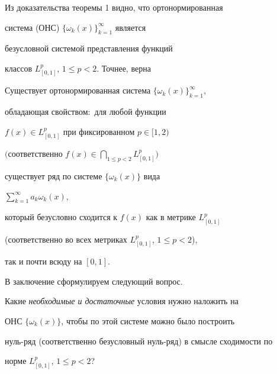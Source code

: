 Из доказательства теоремы 1 видно, что ортонормированная 


система (ОНС) $\{ \omega_k(x)\}_{k=1}^\infty$ является 


безусловной системой представления функций 


классов $L^p_{[0,1]}$, $1 \leq p <2$. Точнее, верна





\begin{thm}


Существует ортонормированная система $\{ \omega_k(x)\}_{k=1}^\infty$,


обладающая свойством$:$ для любой функции


$f(x)\in L^p_{[0,1]}$ при фиксированном $p\in [1,2)$


$($соответственно ${f(x)\in \bigcap\limits_{1 \leq p <2}L^p_{[0,1]}})$


существует ряд по системе $\{ \omega_k(x)\}$ вида


$\sum\limits_{k=1}^\infty a_k\omega_k(x)$,


который безусловно сходится к $f(x)$ как в метрике $L^p_{[0,1]}$


(соответственно во всех метриках $L^p_{[0,1]}$, $1 \leq p <2$),


так и почти всюду на $[0,1]$.


\end{thm}





В заключение сформулируем следующий вопрос.





Какие {\it необходимые и достаточные} условия нужно наложить на 


ОНС $\{ \omega_k(x)\}$, чтобы по этой системе можно было построить 


нуль-ряд (соответственно безусловный нуль-ряд) в смысле сходимости по 


норме $L^p_{[0,1]}$, $1 \leq p <2$?









